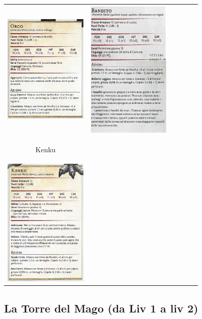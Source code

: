 \documentclass{article}
\begin{document}
\begin{table}
\begin{tabular}{|cr cr cr|}
        \includegraphics[width=4cm, height = 6 cm]{../Mostri/Orco.PNG} & \includegraphics[width=4cm, height = 6 cm]{../Mostri/Bandito.PNG} \\ 
        \hypertarget{kenk}{Kenku} & \\
        \includegraphics[width=4cm, height = 6 cm]{../Mostri/Kenku.PNG}

    \end{tabular}
 

\end{table}







\newpage
\subsection{La Torre del Mago (da Liv 1 a liv 2)}
\end{document}
